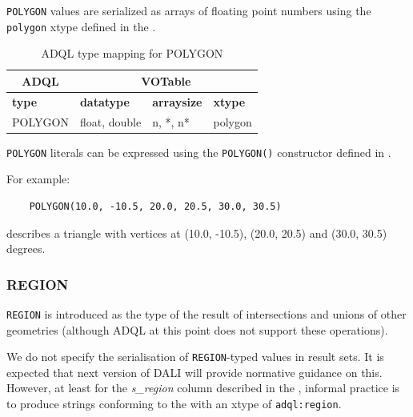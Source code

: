 \documentclass[11pt,a4paper]{ivoa}
\begin{document}
\verb:POLYGON: values are serialized as arrays of floating point numbers
using the \verb:polygon: xtype defined in the \DALISpec{}.

\begin{table}[h]\footnotesize
    \begin{tabular}
        {|p{}|p{}|p{}|p{}|}

        \hline
        \multicolumn{1}{|c|}{\textbf{ADQL}} &
        \multicolumn{3}{|c|}{\textbf{VOTable}}
        \tabularnewline

        \hline
        \textbf{type} &
        \textbf{datatype} &
        \textbf{arraysize} &
        \textbf{xtype}
        \tabularnewline

        \hline
        POLYGON &
        float, double &
        n, *, n* &
        polygon
        \tabularnewline
        \hline
    \end{tabular}
    \caption{ADQL type mapping for POLYGON}
    \label{table:types.geom.polygon}
\end{table}

\verb:POLYGON: literals can be expressed using the \verb:POLYGON():
constructor defined in .

For example:
\begin{verbatim}
    POLYGON(10.0, -10.5, 20.0, 20.5, 30.0, 30.5)
\end{verbatim}
\noindent
describes a triangle with vertices at (10.0, -10.5), (20.0, 20.5)
and (30.0, 30.5) degrees.

\subsubsection{REGION}
\label{sec:types.geom.region}

\verb:REGION: is introduced as the type of the result of intersections and
unions of other geometries (although ADQL at this point does not support
these operations).

We do not specify the serialisation of \verb:REGION:-typed values in result
sets.  It is expected that next version of DALI will provide normative
guidance on this. However, at least for the \textit{s\_region}
column described in the \ObsCoreSpec{},
informal practice is to produce strings conforming to the \STCSAppendix{} with
an xtype of \texttt{adql:region}.
\end{document}
